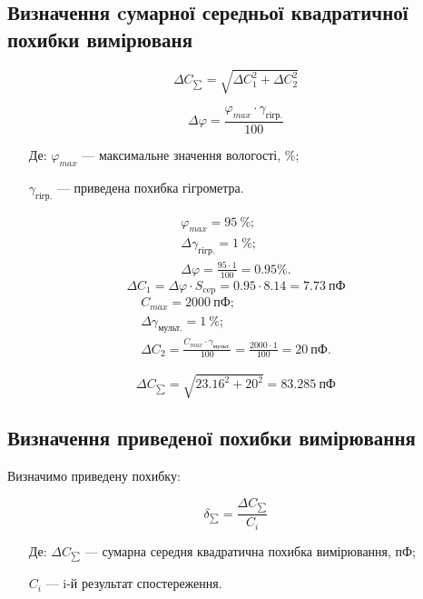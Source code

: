  


\subsection{Визначення cумарної середньої квадратичної похибки вимірюваня}

\begin{equation}
  \Delta C_{\sum} = \sqrt{\Delta C_1^2 + \Delta C_2^2}
\end{equation}

\begin{equation}
  \Delta \varphi = \frac{\varphi_{max} \cdot \gamma_{\text{гігр.}} }{100}
\end{equation}
\begin{itemize}
\item [Де:] $\varphi_{max}$ --- максимальне значення вологості, \%;
\item []$\gamma_{\text{гігр.}}$ ---  приведена похибка гігрометра.
\end{itemize}

\begin{gather}
  \varphi_{max} = 95 ~\%; \nonumber\\
  \Delta \gamma_{\text{гігр.}} = 1 ~\%; \\
  \Delta \varphi = \frac{95 \cdot 1}{100} = 0.95 \%. \nonumber
\end{gather}
\begin{equation}
    \Delta C_1 = \Delta \varphi \cdot S_{\text{cep}} = 0.95 \cdot 8.14 = 7.73 ~\text{пФ}
\end{equation}
\begin{gather}
    C_{max} = 2000 ~\text{пФ}; \nonumber\\
    \Delta \gamma_{\text{мульт.}} = 1 ~\%; \\
    \Delta C_2 = \frac{C_{max} \cdot \gamma_{\text{мульт.}}}{100} = \frac{2000 \cdot 1}{100} = 20 ~\text{пФ}. \nonumber
\end{gather}

\begin{equation}
  \Delta C_{\sum}  = \sqrt{23.16^2 + 20^2} = 83.285 ~\text{пФ}
\end{equation}

\subsection{Визначення приведеної похибки вимірювання}
Визначимо приведену похибку:

\begin{equation}
    \delta_{\sum} = \frac{\Delta C_{\sum}}{C_i}
\end{equation}
\begin{itemize}
\item [Де:] $\Delta C_{\sum}$ --- сумарна середня квадратична похибка вимірювання, пФ;
\item []$C_i$ ---  i-й результат спостереження.
\end{itemize}


